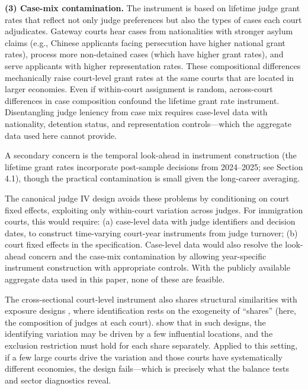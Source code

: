 \documentclass[12pt]{article}
\begin{document}
\textbf{(3) Case-mix contamination.} The instrument is based on lifetime judge grant rates that reflect not only judge preferences but also the types of cases each court adjudicates. Gateway courts hear cases from nationalities with stronger asylum claims (e.g., Chinese applicants facing persecution have higher national grant rates), process more non-detained cases (which have higher grant rates), and serve applicants with higher representation rates. These compositional differences mechanically raise court-level grant rates at the same courts that are located in larger economies. Even if within-court assignment is random, across-court differences in case composition confound the lifetime grant rate instrument. Disentangling judge leniency from case mix requires case-level data with nationality, detention status, and representation controls---which the aggregate data used here cannot provide.

A secondary concern is the temporal look-ahead in instrument construction (the lifetime grant rates incorporate post-sample decisions from 2024--2025; see Section 4.1), though the practical contamination is small given the long-career averaging.

The canonical judge IV design avoids these problems by conditioning on court fixed effects, exploiting only within-court variation across judges. For immigration courts, this would require: (a) case-level data with judge identifiers and decision dates, to construct time-varying court-year instruments from judge turnover; (b) court fixed effects in the specification. Case-level data would also resolve the look-ahead concern and the case-mix contamination by allowing year-specific instrument construction with appropriate controls. With the publicly available aggregate data used in this paper, none of these are feasible.

The cross-sectional court-level instrument also shares structural similarities with exposure designs \citep{borusyak2022quasi, goldsmithpinkham2020bartik}, where identification rests on the exogeneity of ``shares'' (here, the composition of judges at each court). \citet{goldsmithpinkham2020bartik} show that in such designs, the identifying variation may be driven by a few influential locations, and the exclusion restriction must hold for each share separately. Applied to this setting, if a few large courts drive the variation and those courts have systematically different economies, the design fails---which is precisely what the balance tests and sector diagnostics reveal.
\end{document}
